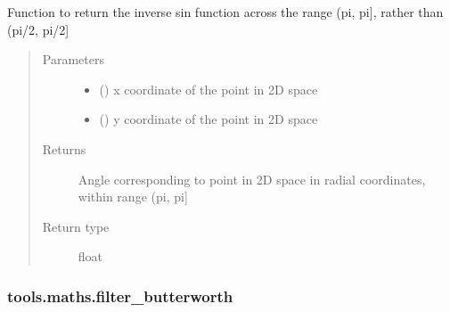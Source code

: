 \documentclass[letterpaper,10pt,english]{sphinxmanual}
\begin{document}
\begin{fulllineitems}
\label{\detokenize{_autosummary/tools.maths.asin2:tools.maths.asin2}}
\sphinxAtStartPar
Function to return the inverse sin function across the range (\sphinxhyphen{}pi, pi{]}, rather than (\sphinxhyphen{}pi/2, pi/2{]}
\begin{quote}\begin{description}
\item[{Parameters}] \leavevmode\begin{itemize}
\item {} 
\sphinxAtStartPar
{} () \textendash{} x coordinate of the point in 2D space

\item {} 
\sphinxAtStartPar
{} () \textendash{} y coordinate of the point in 2D space

\end{itemize}

\item[{Returns}] \leavevmode
\sphinxAtStartPar
{} \textendash{} Angle corresponding to point in 2D space in radial coordinates, within range (\sphinxhyphen{}pi, pi{]}

\item[{Return type}] \leavevmode
\sphinxAtStartPar
float

\end{description}\end{quote}

\end{fulllineitems}



\subsubsection{tools.maths.filter\_butterworth}
\label{\detokenize{_autosummary/tools.maths.filter_butterworth:tools-maths-filter-butterworth}}\label{\detokenize{_autosummary/tools.maths.filter_butterworth::doc}}
\end{document}
